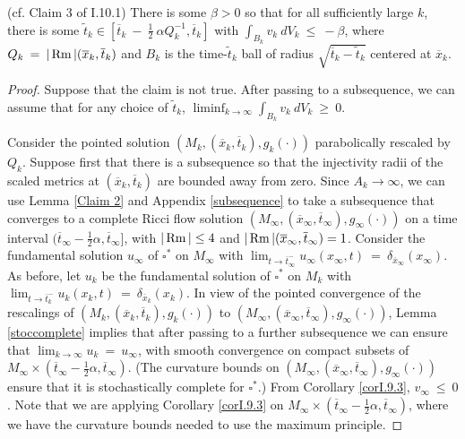 \begin{lemma}
  \label{lem:kl-upper-bound-integral-integral-bound-pseudolocality-2}
 (cf. Claim 3 of I.10.1) \label{Claim 3}
There is some $\beta > 0$ so that for
all sufficiently large $k$,
there is some
$\widetilde{t}_k \in [\overline{t}_k \: - \: \frac12 \: \alpha Q_k^{-1}, \overline{t}_k]$ with
$\int_{B_k} v_k \: dV_k \: \le \: - \beta$, where $Q_k \: = \: |\operatorname{Rm}|(\overline{x}_k,
\overline{t}_k)$ and $B_k$ is the time-$\widetilde{t}_k$ ball of radius
$\sqrt{\overline{t}_k - \widetilde{t}_k}$ centered at $\overline{x}_k$.
\end{lemma}
\begin{proof}
Suppose that the claim is not true.  After passing to a subsequence, we
can assume that for any choice of $\widetilde{t}_k$,
$\liminf_{k \rightarrow \infty}
\int_{B_k} v_k \: dV_k \: \ge \: 0$.


Consider the pointed solution $(M_k, (\overline{x}_k, \overline{t}_k), g_k(\cdot))$
parabolically rescaled by $Q_k$.
Suppose first that there is a subsequence so that
the injectivity radii of the scaled metrics at
$(\overline{x}_k, \overline{t}_k)$ are bounded away from zero.
Since $A_k \rightarrow \infty$, we can use
Lemma \ref{Claim 2} and
Appendix \ref{subsequence} to
take a subsequence that converges to a complete Ricci flow solution
$(M_\infty, (\overline{x}_\infty, \overline{t}_\infty), g_\infty(\cdot))$ on a
time interval $(\overline{t}_\infty - \frac12 \alpha, \overline{t}_\infty]$, with
$|\operatorname{Rm}| \le 4$ and $|\operatorname{Rm}|(\overline{x}_\infty, \overline{t}_\infty) = 1$.
Consider the fundamental solution $u_\infty$ of $\square^*$ on $M_\infty$
with $\lim_{t \rightarrow \overline{t}_\infty^-} u_\infty(x_\infty, t) \: = \:
\delta_{\overline{x}_\infty}(x_\infty)$.
As before,
let $u_k$ be the fundamental solution
of $\square^*$ on $M_k$
with $\lim_{t \rightarrow \overline{t}_k^-} u_k(x_k, t) \: = \:
\delta_{\overline{x}_k}(x_k)$.
In view of the pointed convergence of the rescalings of
$(M_k, (\overline{x}_k, \overline{t}_k), g_k(\cdot))$ to
$(M_\infty, (\overline{x}_\infty, \overline{t}_\infty),
g_\infty(\cdot))$,
Lemma \ref{stoccomplete} implies that
after passing to a further subsequence we can ensure that
$\lim_{k \rightarrow \infty} u_k \: = \: u_\infty$, with
smooth convergence on
compact subsets of $M_\infty \times (\overline{t}_\infty
 - \frac12 \alpha, \overline{t}_\infty)$.
(The curvature bounds on
$(M_\infty, (\overline{x}_\infty, \overline{t}_\infty),
g_\infty(\cdot))$ ensure that it is stochastically complete
for $\square^*$.)
From Corollary \ref{corI.9.3}, $v_\infty \: \le \: 0$.
Note that we are applying Corollary \ref{corI.9.3} on
$M_\infty \times (\overline{t}_\infty
- \frac12 \alpha, \overline{t}_\infty)$,
where we have the curvature bounds needed to use the maximum
principle.



\end{proof}
